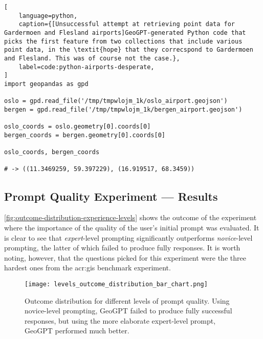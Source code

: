 \FloatBarrier

\begin{lstlisting}[
    language=python,
    caption={[Unsuccessful attempt at retrieving point data for Gardermoen and Flesland airports]GeoGPT-generated Python code that picks the first feature from two collections that include various point data, in the \textit{hope} that they correcspond to Gardermoen and Flesland. This was of course not the case.},
    label=code:python-airports-desperate,
]
import geopandas as gpd

oslo = gpd.read_file('/tmp/tmpwlojm_1k/oslo_airport.geojson')
bergen = gpd.read_file('/tmp/tmpwlojm_1k/bergen_airport.geojson')

oslo_coords = oslo.geometry[0].coords[0]
bergen_coords = bergen.geometry[0].coords[0]

oslo_coords, bergen_coords   

# -> ((11.3469259, 59.397229), (16.919517, 68.3459))
\end{lstlisting}


\newpage

\subsection{Prompt Quality Experiment --- Results}
\label{subsec:prompt-quality-test-results}

\autoref{fig:outcome-distribution-experience-levels} shows the outcome of the experiment where the importance of the quality of the user's initial prompt was evaluated. It is clear to see that \textit{expert}-level prompting significantly outperforms \textit{novice}-level prompting, the latter of which failed to produce fully responses. It is worth noting, however, that the questions picked for this experiment were the three hardest ones from the \acrshort{acr:gis} benchmark experiment.

\begin{figure}[htbp]
    \centering
    \texttt{[image: levels\_outcome\_distribution\_bar\_chart.png]}
    \caption[Outcome distribution for different levels of prompt quality]{Outcome distribution for different levels of prompt quality. Using novice-level prompting, GeoGPT failed to produce fully successful responses, but using the more elaborate expert-level prompt, GeoGPT performed much better.}
    \label{fig:outcome-distribution-experience-levels}
\end{figure}


